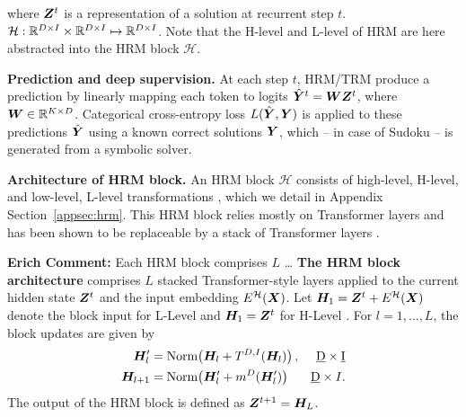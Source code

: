 \documentclass{article}
\theoremstyle{plain}
\theoremstyle{definition}
\theoremstyle{remark}
\newcommand{\EKComment}[1]{\textcolor{mydarkred}{\textbf{Erich Comment:} #1}}
\renewcommand{\paragraph}[1]{\textbf{#1}\;}
\begin{document}
where $\bm{Z}^t$ is a representation 
of a solution at recurrent step $t$. 
$\mathcal H: \mathbb{R}^{D \times I} \times \mathbb{R}^{D \times I} \mapsto \mathbb{R}^{D \times I}$.
Note that the H-level and L-level of 
HRM are here abstracted into the HRM block
$\mathcal H$.

\paragraph{Prediction and deep supervision. }
At each step $t$, HRM/TRM produce a 
prediction by linearly 
mapping each token to logits 
$\hat {\bm{Y}}^t=\bm{W} \bm{Z}^t$, where 
$\bm{W} \in \mathbb{R}^{K \times D}$.
Categorical cross-entropy loss $L(\hat {\bm{Y}}, \bm{Y})$ 
is applied
to these predictions $\hat {\bm{Y}}$ using a 
known correct solutions $\bm{Y}$, which -- in case
of Sudoku -- is generated from a symbolic solver.



\paragraph{Architecture of HRM block.}
An HRM block $\mathcal H$ consists of high-level, H-level, and low-level, L-level transformations \citep{wang2025hierarchical}, which we detail in Appendix Section~\ref{appsec:hrm}. This HRM block relies mostly on Transformer \citep{vaswani2017attention} layers and has been shown to be replaceable by a stack of Transformer layers \citep{arc2025hidden, liao2026srm}. 

\EKComment{
Each HRM block comprises $L$ \ldots
}
\paragraph{The HRM block architecture} comprises $L$ stacked Transformer-style layers applied to the current hidden state $\bm{Z}^t$ and the input embedding $E^{\mathcal H}(\bm{X})$. Let $\bm{H}_1 = \bm{Z}^t + E^{\mathcal H}(\bm{X})$ denote the block input for L-Level and $\bm{H}_1 = \bm{Z}^t$ for H-Level \citep{wang2025hierarchical}. For $l = 1, \ldots, L$, the block updates are given by
\begin{align}
    \bm{H}'_{l} &= \text{Norm}\!\left(
        \bm{H}_{l} + T^{D,I}(\bm{H}_{l})
    \right), & \underbar{D} \times \underbar{I} \\
    \bm{H}_{l+1} &= \text{Norm}\!\left(
        \bm{H}'_{l} + m^{D}(\bm{H}'_{l})
    \right) & \underbar{D} \times I  .
\end{align}
The output of the HRM block is defined as $\bm{Z}^{t+1} = \bm{H}_L$.
\end{document}
